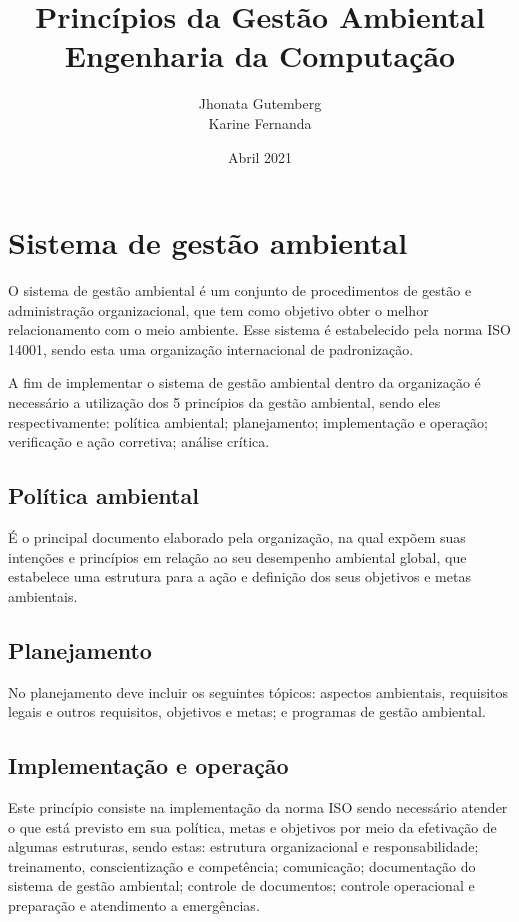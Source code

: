 \documentclass[a4paper, 12pt]{article}
\title{
    Princípios da Gestão Ambiental \\
    \large Engenharia da Computação
}
\author{
    Jhonata Gutemberg \\
    Karine Fernanda
}
\date{Abril 2021}
\begin{document}
    \maketitle

    \section{Sistema de gestão ambiental}

    \par O sistema de gestão ambiental é um conjunto de procedimentos de gestão e administração organizacional, que tem como objetivo obter o melhor relacionamento com o meio ambiente. Esse sistema é estabelecido pela norma ISO 14001, sendo esta uma organização internacional de padronização.

    \par A fim de implementar o sistema de gestão ambiental dentro da organização é necessário a utilização dos 5 princípios da gestão ambiental, sendo eles respectivamente: política ambiental; planejamento; implementação e operação; verificação e ação corretiva; análise crítica.

    \subsection{Política ambiental}

    \par É o principal documento elaborado pela organização, na qual expõem suas intenções e princípios em relação ao seu desempenho ambiental global, que estabelece uma estrutura para a ação e definição dos seus objetivos e metas ambientais.

    \subsection{Planejamento}

    \par No planejamento deve incluir os seguintes tópicos: aspectos ambientais, requisitos legais e outros requisitos, objetivos e metas; e programas de gestão ambiental.

    \subsection{Implementação e operação}

    \par Este princípio consiste na implementação da norma ISO sendo necessário atender o que está previsto em sua política, metas e objetivos por meio da efetivação de algumas estruturas, sendo estas: estrutura organizacional e responsabilidade; treinamento, conscientização e competência; comunicação; documentação do sistema de gestão ambiental; controle de documentos; controle operacional e preparação e atendimento a emergências.
    
\end{document}

